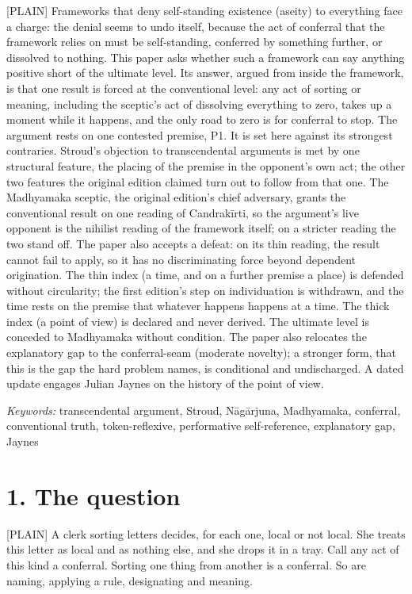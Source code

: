 \documentclass[11pt]{article}
\newcommand{\register}[1]{{\ttfamily\small #1}}
\begin{document}
\register{[PLAIN]} Frameworks that deny self-standing existence (aseity) to everything face a charge: the denial seems to undo itself, because the act of conferral that the framework relies on must be self-standing, conferred by something further, or dissolved to nothing. This paper asks whether such a framework can say anything positive short of the ultimate level. Its answer, argued from inside the framework, is that one result is forced at the conventional level: any act of sorting or meaning, including the sceptic's act of dissolving everything to zero, takes up a moment while it happens, and the only road to zero is for conferral to stop. The argument rests on one contested premise, P1. It is set here against its strongest contraries. Stroud's objection to transcendental arguments is met by one structural feature, the placing of the premise in the opponent's own act; the other two features the original edition claimed turn out to follow from that one. The Madhyamaka sceptic, the original edition's chief adversary, grants the conventional result on one reading of Candrakīrti, so the argument's live opponent is the nihilist reading of the framework itself; on a stricter reading the two stand off. The paper also accepts a defeat: on its thin reading, the result cannot fail to apply, so it has no discriminating force beyond dependent origination. The thin index (a time, and on a further premise a place) is defended without circularity; the first edition's step on individuation is withdrawn, and the time rests on the premise that whatever happens happens at a time. The thick index (a point of view) is declared and never derived. The ultimate level is conceded to Madhyamaka without condition. The paper also relocates the explanatory gap to the conferral-seam (moderate novelty); a stronger form, that this is the gap the hard problem names, is conditional and undischarged. A dated update engages Julian Jaynes on the history of the point of view.

\emph{Keywords:} transcendental argument, Stroud, Nāgārjuna, Madhyamaka, conferral, conventional truth, token-reflexive, performative self-reference, explanatory gap, Jaynes

\section*{1. The question}

\register{[PLAIN]} A clerk sorting letters decides, for each one, local or not local. She treats this letter as local and as nothing else, and she drops it in a tray. Call any act of this kind a conferral. Sorting one thing from another is a conferral. So are naming, applying a rule, designating and meaning.
\end{document}
